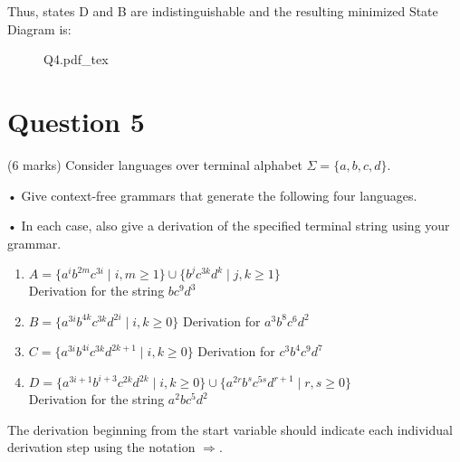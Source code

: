 \documentclass[12pt]{book}
\newcommand{\incfig}[1]{%
    {#1.pdf_tex}
}
\begin{document}
\begin{enumerate}
                Thus, states D and B are indistinguishable and the resulting minimized State Diagram is:
                \begin{figure}[h]
                        \centering
                        \incfig{Q4}
                \end{figure}

\end{enumerate}

\section*{Question 5}
(6 marks) Consider languages over terminal alphabet $\Sigma = \{a, b, c, d\}$.


• Give context-free grammars that generate the following four languages.


• In each case, also give a derivation of the specified terminal string using your grammar. 
\begin{enumerate}[label=\alph*)]
        \item $A = \{a^ib^{2m} c^{3i} \mid i,m\geq 1\}\cup\{b^jc^{3k}d^k \mid j,k\geq 1\}$\\
                Derivation for the string $bc^9d^3$
        \item $B = \{a^{3i} b^{4k} c^{3k}d^{2i}  \mid i,k\geq 0\}$ Derivation for  $a^3b^8c^6d^{2}$
        \item $C = \{a^{3i}b^{4i}c^{3k} d^{2k+1} \mid i,k\geq 0\}$ Derivation for $c^3 b^4 c^9 d^7$
        \item $D = \{a^{3i+1}b^{i+3}c^{2k} d^{2k} \mid i,k\geq 0\}\cup \{a^{2r}b^sc^{5s}d^{r+1} \mid r,s\geq 0\}$\\
                Derivation for the string $a^2bc^5d^2$
\end{enumerate}

The derivation beginning from the start variable should indicate each individual
derivation step using the notation $\Rightarrow$.
\end{document}
